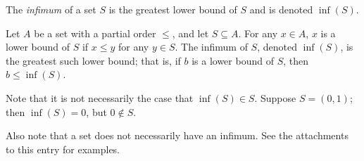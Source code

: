 \documentclass[12pt]{article}
\begin{document}
The \emph{infimum} of a set $S$ is the greatest lower bound of $S$ and is denoted $\inf(S)$.

Let $A$ be a set with a partial order $\leq$, and let $S \subseteq A$.  For any $x \in A$, $x$ is a lower bound of $S$ if $x \leq y$ for any $y \in S$.  The  infimum of $S$, denoted $\inf(S)$, is the greatest such lower bound; that is, if $b$ is a lower bound of $S$, then $b \leq \inf(S)$.

Note that it is not necessarily the case that $\inf(S) \in S$.  Suppose $S = (0, 1)$; then $\inf(S) = 0$, but $0 \not\in S$.

Also note that a set does not necessarily have an infimum. See the attachments to this entry for examples.
\end{document}
